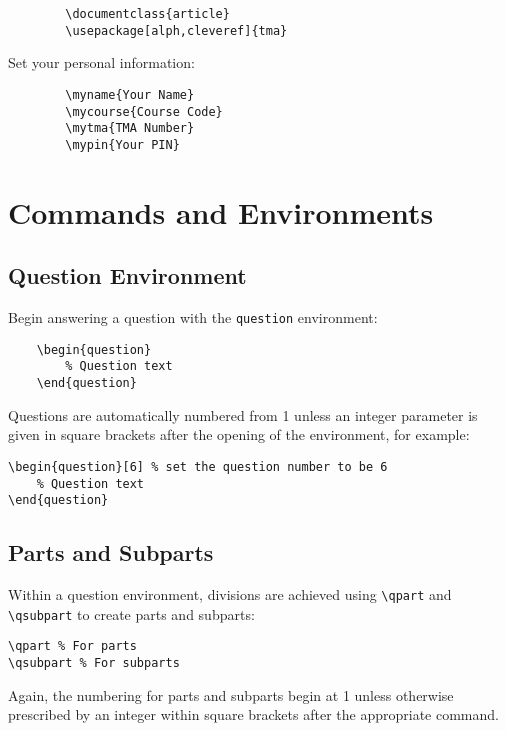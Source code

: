\documentclass[twoside]{article}
\begin{document}
	\begin{verbatim}
		\documentclass{article}
		\usepackage[alph,cleveref]{tma}
	\end{verbatim}
	
	Set your personal information:
	
	\begin{verbatim}
		\myname{Your Name}
		\mycourse{Course Code}
		\mytma{TMA Number}
		\mypin{Your PIN}
	\end{verbatim}
	
	\section{Commands and Environments}
	
	\subsection{Question Environment}
	
	Begin answering a question with the \texttt{question} environment:
	
	\begin{verbatim}
	\begin{question}
		% Question text
	\end{question}
\end{verbatim}

Questions are automatically numbered from 1 unless an integer parameter is given in square brackets after the opening of the environment, for example:

\begin{verbatim}
\begin{question}[6] % set the question number to be 6
	% Question text
\end{question}
\end{verbatim}

\subsection{Parts and Subparts}

Within a question environment, divisions are achieved using \verb|\qpart| and \verb|\qsubpart| to create parts and subparts:

\begin{verbatim}
\qpart % For parts
\qsubpart % For subparts
\end{verbatim}

Again, the numbering for parts and subparts begin at 1 unless otherwise prescribed by an integer within square brackets after the appropriate command.
\end{document}
